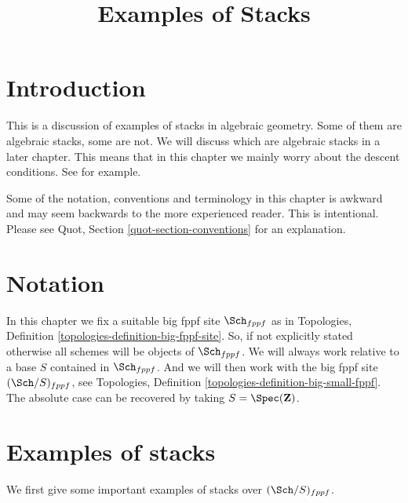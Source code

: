 

%


\title{Examples of Stacks}


\maketitle

\label{section-phantom}

\tableofcontents

\section{Introduction}
\label{section-introduction}

\noindent
This is a discussion of examples of stacks in algebraic geometry.
Some of them are algebraic stacks, some are not.
We will discuss which are algebraic stacks in a later chapter.
This means that in this chapter we mainly worry about the descent
conditions. See \cite{Vis2} for example.

\medskip\noindent
Some of the notation, conventions and terminology in this chapter is awkward
and may seem backwards to the more experienced reader. This is intentional.
Please see Quot, Section \ref{quot-section-conventions} for an
explanation.




\section{Notation}
\label{section-notation}

\noindent
In this chapter we fix a suitable big fppf site $\Sch_{fppf}$
as in Topologies, Definition \ref{topologies-definition-big-fppf-site}.
So, if not explicitly stated otherwise all schemes will be objects
of $\Sch_{fppf}$.
We will always work relative to a base $S$ contained in $\Sch_{fppf}$.
And we will then work with the big fppf site $(\Sch/S)_{fppf}$,
see Topologies, Definition \ref{topologies-definition-big-small-fppf}.
The absolute case can be recovered by taking
$S = \Spec(\mathbf{Z})$.




\section{Examples of stacks}
\label{section-examples-stacks}

\noindent
We first give some important examples of stacks over
$(\Sch/S)_{fppf}$.






